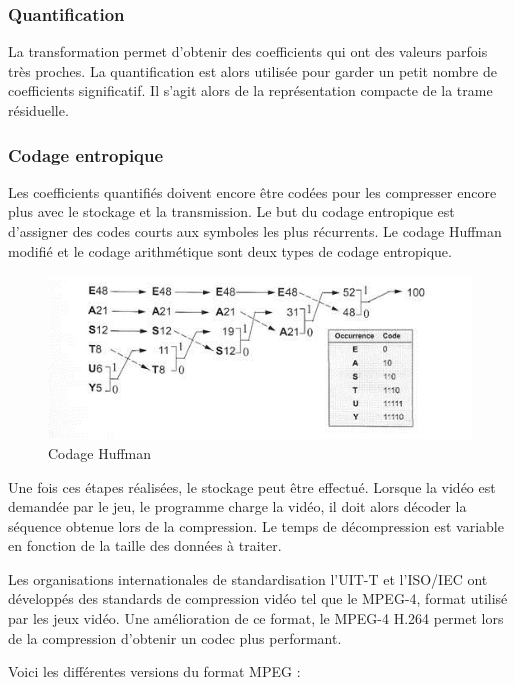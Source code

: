 \documentclass[a4paper, 11pt]{article} %
\begin{document}
\subsubsection{Quantification}
La transformation permet d'obtenir des coefficients qui ont des valeurs parfois très proches. La quantification est alors utilisée pour garder un petit nombre de coefficients significatif. Il s'agit alors de la représentation compacte de la trame résiduelle.

\subsubsection{Codage entropique}
Les coefficients quantifiés doivent encore être codées pour les compresser encore plus avec le stockage et la transmission. Le but du codage entropique est d'assigner des codes courts aux symboles les plus récurrents. Le codage Huffman modifié et le codage arithmétique sont deux types de codage entropique.

\begin{figure}[!h]%
\includegraphics[width=\columnwidth]{images/codage_huffman.jpg}%
\caption{Codage Huffman}%
\label{}%
\end{figure}

\newpage

Une fois ces étapes réalisées, le stockage peut être effectué. Lorsque la vidéo est demandée par le jeu, le programme charge la vidéo, il doit alors décoder la séquence obtenue lors de la compression. Le temps de décompression est variable en fonction de la taille des données à traiter. 

Les organisations internationales de standardisation l'UIT-T et l'ISO/IEC ont développés des standards de compression vidéo tel que le MPEG-4, format utilisé par les jeux vidéo. Une amélioration de ce format, le MPEG-4 H.264 permet lors de la compression d'obtenir un codec plus performant.

Voici les différentes versions du format MPEG :
\end{document}
